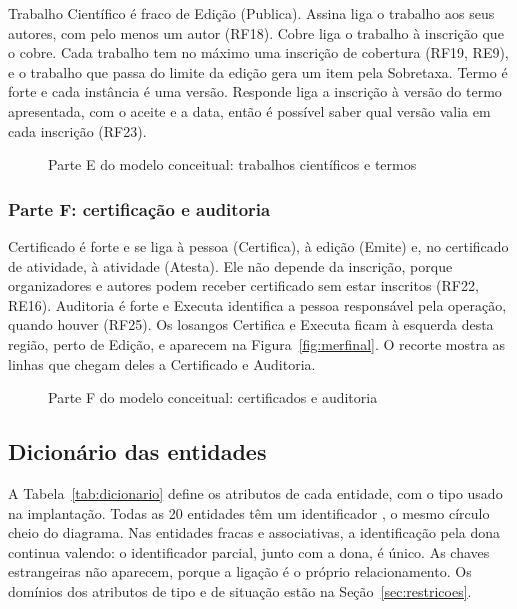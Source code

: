 Trabalho Científico é fraco de Edição (Publica). Assina liga o trabalho aos seus autores, com pelo menos um autor (RF18). Cobre liga o trabalho à inscrição que o cobre. Cada trabalho tem no máximo uma inscrição de cobertura (RF19, RE9), e o trabalho que passa do limite da edição gera um item pela Sobretaxa. Termo é forte e cada instância é uma versão. Responde liga a inscrição à versão do termo apresentada, com o aceite e a data, então é possível saber qual versão valia em cada inscrição (RF23).

\begin{figure}[h!]
\centering
\merE
\caption{Parte E do modelo conceitual: trabalhos científicos e termos}
\label{fig:merE}
\end{figure}

\subsubsection*{Parte F: certificação e auditoria}

Certificado é forte e se liga à pessoa (Certifica), à edição (Emite) e, no certificado de atividade, à atividade (Atesta). Ele não depende da inscrição, porque organizadores e autores podem receber certificado sem estar inscritos (RF22, RE16). Auditoria é forte e Executa identifica a pessoa responsável pela operação, quando houver (RF25). Os losangos Certifica e Executa ficam à esquerda desta região, perto de Edição, e aparecem na Figura~\ref{fig:merfinal}. O recorte mostra as linhas que chegam deles a Certificado e Auditoria.

\begin{figure}[h!]
\centering
\merF
\caption{Parte F do modelo conceitual: certificados e auditoria}
\label{fig:merF}
\end{figure}

\FloatBarrier
\subsection{Dicionário das entidades}

A Tabela~\ref{tab:dicionario} define os atributos de cada entidade, com o tipo usado na implantação. Todas as 20 entidades têm um identificador , o mesmo círculo cheio do diagrama. Nas entidades fracas e associativas, a identificação pela dona continua valendo: o identificador parcial, junto com a dona, é único. As chaves estrangeiras não aparecem, porque a ligação é o próprio relacionamento. Os domínios dos atributos de tipo e de situação estão na Seção~\ref{sec:restricoes}.

